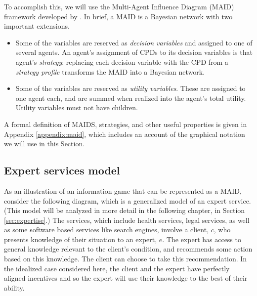 \documentclass[../thesis.tex]{subfiles}
\begin{document}
To accomplish this, we will use the Multi-Agent Influence Diagram
(MAID) framework developed by \citet{koller2003multi}.
In brief, a MAID is a Bayesian network with two important
extensions.

\begin{itemize}
\item Some of the variables are reserved as \emph{decision variables}
  and assigned to one of several agents.
  An agent's assignment of CPDs to its decision variables is
  that agent's \emph{strategy}; replacing each decision variable
  with the CPD from a \emph{strategy profile} transforms the MAID
  into a Bayesian network.
\item Some of the variables are reserved as \emph{utility variables}.
  These are assigned to one agent each, and are summed when realized
  into the agent's total utility.
  Utility variables must not have children.
\end{itemize}

A formal definition of MAIDS, strategies, and other useful
properties is given in Appendix \ref{appendix:maid},
which includes an account of the graphical notation we
will use in this Section.

\subsection{Expert services model}
\label{sec:expert-services-ECS}

As an illustration of an information game
that can be represented as a MAID, consider the
following diagram, which is a generalized model of
an expert service. (This model will be analyzed in more detail
in the following chapter, in Section \ref{sec:expertise}.)
The services, which include health services, legal services,
as well as some software based services like search engines,
involve a client, $c$, who presents knowledge of their situation
to an expert, $e$.
The expert has access to general knowledge relevant to the
client's condition, and recommends some action based on
this knowledge.
The client can choose to take this recommendation.
In the idealized case considered here, the client
and the expert have perfectly aligned incentives and
so the expert will use their knowledge to the best
of their ability.

\begin{center}
\end{center}
\end{document}
